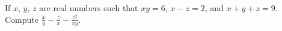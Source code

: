 If $x$, $y$, $z$ are real numbers such that $xy = 6$, $x - z = 2$, and $x + y + z = 9$. Compute $\frac{x}{y} - \frac{z}{x} - \frac{z^2}{xy}$.
